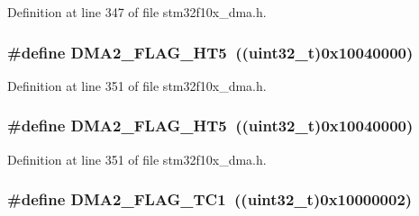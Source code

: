 Definition at line 347 of file stm32f10x\+\_\+dma.\+h.

\subsubsection[{\texorpdfstring{D\+M\+A2\+\_\+\+F\+L\+A\+G\+\_\+\+H\+T5}{DMA2_FLAG_HT5}}]{\setlength{\rightskip}{0pt plus 5cm}\#define D\+M\+A2\+\_\+\+F\+L\+A\+G\+\_\+\+H\+T5~(({\bf uint32\+\_\+t})0x10040000)}\hypertarget{group___d_m_a__flags__definition_ga23aabf34428e04d7b46368e0b595a4d5}{}\label{group___d_m_a__flags__definition_ga23aabf34428e04d7b46368e0b595a4d5}


Definition at line 351 of file stm32f10x\+\_\+dma.\+h.

\subsubsection[{\texorpdfstring{D\+M\+A2\+\_\+\+F\+L\+A\+G\+\_\+\+H\+T5}{DMA2_FLAG_HT5}}]{\setlength{\rightskip}{0pt plus 5cm}\#define D\+M\+A2\+\_\+\+F\+L\+A\+G\+\_\+\+H\+T5~(({\bf uint32\+\_\+t})0x10040000)}\hypertarget{group___d_m_a__flags__definition_ga23aabf34428e04d7b46368e0b595a4d5}{}\label{group___d_m_a__flags__definition_ga23aabf34428e04d7b46368e0b595a4d5}


Definition at line 351 of file stm32f10x\+\_\+dma.\+h.

\subsubsection[{\texorpdfstring{D\+M\+A2\+\_\+\+F\+L\+A\+G\+\_\+\+T\+C1}{DMA2_FLAG_TC1}}]{\setlength{\rightskip}{0pt plus 5cm}\#define D\+M\+A2\+\_\+\+F\+L\+A\+G\+\_\+\+T\+C1~(({\bf uint32\+\_\+t})0x10000002)}\hypertarget{group___d_m_a__flags__definition_ga828c97967dbdb48d267ed0f0c4e9b8a5}{}\label{group___d_m_a__flags__definition_ga828c97967dbdb48d267ed0f0c4e9b8a5}


